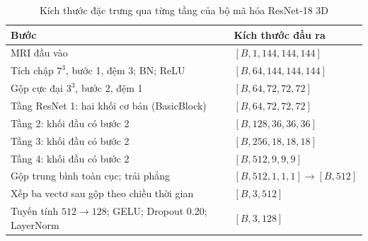 \begin{table}[H]
\centering
\small
\caption[Kích thước đặc trưng của bộ mã hóa ResNet-18 3D]{Kích thước đặc trưng qua từng tầng của bộ mã hóa ResNet-18 3D}
\label{tab:mri-encoder-shapes}
\begin{tabularx}{\textwidth}{@{}Y l@{}}
\toprule
\textbf{Bước} & \textbf{Kích thước đầu ra} \\
\midrule
MRI đầu vào & $[B,1,144,144,144]$ \\
Tích chập $7^3$, bước 1, đệm 3; BN; ReLU & $[B,64,144,144,144]$ \\
Gộp cực đại $3^3$, bước 2, đệm 1 & $[B,64,72,72,72]$ \\
Tầng ResNet 1: hai khối cơ bản (BasicBlock) & $[B,64,72,72,72]$ \\
Tầng 2: khối đầu có bước 2 & $[B,128,36,36,36]$ \\
Tầng 3: khối đầu có bước 2 & $[B,256,18,18,18]$ \\
Tầng 4: khối đầu có bước 2 & $[B,512,9,9,9]$ \\
Gộp trung bình toàn cục; trải phẳng & $[B,512,1,1,1]\to[B,512]$ \\
Xếp ba vectơ sau gộp theo chiều thời gian & $[B,3,512]$ \\
Tuyến tính $512\to128$; GELU; Dropout 0.20; LayerNorm & $[B,3,128]$ \\
\bottomrule
\end{tabularx}
\end{table}

\endgroup
